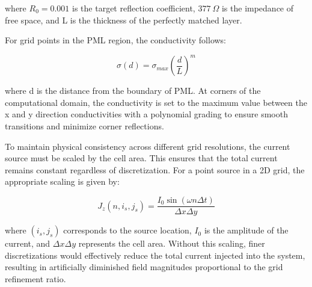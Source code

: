 \documentclass[journal]{IEEEtran}
\begin{document}
where $R_0 = 0.001$ is the target reflection coefficient, $377~\Omega$ is the impedance of free space, 
and L is the thickness of the perfectly matched layer.

For grid points in the PML region, the conductivity follows:

\begin{equation}
\sigma(d) = \sigma_{max} \left(\frac{d}{L}\right)^m
\end{equation}

where d is the distance from the boundary of PML. At corners of the computational domain, the conductivity is set to the maximum value between the x and y direction conductivities with a polynomial grading to ensure smooth transitions and minimize corner reflections.

To maintain physical consistency across different grid resolutions, the current source must be scaled by the cell area. This ensures that the total current remains constant regardless of discretization. For a point source in a 2D grid, the appropriate scaling is given by:

\begin{equation}
J_z(n, i_s, j_s) = \frac{I_0 \sin(\omega n \Delta t)}{\Delta x \Delta y}
\end{equation}

where $(i_s, j_s)$ corresponds to the source location, $I_0$ is the amplitude of the current, and $\Delta x \Delta y$ represents the cell area. Without this scaling, finer discretizations would effectively reduce the total current injected into the system, resulting in 
artificially diminished field magnitudes proportional to the grid refinement ratio.
\end{document}
